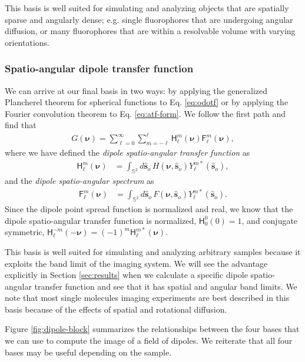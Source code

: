 \documentclass[]{osa-article}
\providecommand{\msf}[1]{\mathsf{#1}}
\providecommand{\so}{\mathbf{\hat{s}}_o}
\providecommand{\mbb}[1]{\mathbb{#1}}
\providecommand{\bs}[1]{\boldsymbol{#1}}
\providecommand{\bv}{\bs{\nu}}
\providecommand{\lmsum}{\sum_{\ell=0}^\infty\sum_{m=-\ell}^{\ell}}
\begin{document}
This basis is well suited for simulating and analyzing objects that are
spatially sparse and angularly dense; e.g. single fluorophores that are
undergoing angular diffusion, or many fluorophores that are within a resolvable
volume with varying orientations.

\subsubsection{Spatio-angular dipole transfer function}
We can arrive at our final basis in two ways: by applying the generalized
Plancherel theorem for spherical functions to Eq. \eqref{eq:odotf} or by applying
the Fourier convolution theorem to Eq. \eqref{eq:atf-form}. We follow the
first path and find that
\begin{align}
G(\bv) = \lmsum \msf{H}_\ell^m(\bv)\msf{F}_\ell^m(\bv) \label{eq:saft},
\end{align}
where we have defined the \textit{dipole spatio-angular transfer function} as
  \begin{align}
  \msf{H}_\ell^m(\bv) &= \int_{\mbb{S}^2}d\so\, H(\bv, \so)Y_\ell^{m*}(\so),
  \end{align}
  and the \textit{dipole spatio-angular spectrum} as
  \begin{align}
  \msf{F}_\ell^m(\bv) &= \int_{\mbb{S}^2}d\so\, F(\bv, \so)Y_\ell^{m*}(\so).
  \end{align}
  Since the dipole point spread function is normalized and real, we know
  that the dipole spatio-angular transfer function is normalized,
  $\msf{H}_0^0(0) = 1$, and conjugate symmetric,
  $\msf{H}_\ell^{-m}(-\bv) = (-1)^m\msf{H}_\ell^{m*}(\bv)$.
  
  This basis is well suited for simulating and analyzing arbitrary samples
  because it exploits the band limit of the imaging system. We will see the
  advantage explicitly in Section \ref{sec:results} when we calculate a specific
  dipole spatio-angular transfer function and see that it has spatial and
  angular band limits. We note that most single molecules imaging experiments
  are best described in this basis because of the effects of spatial and
  rotational diffusion.

  Figure \ref{fig:dipole-block} summarizes the relationships between the four
  bases that we can use to compute the image of a field of dipoles. We reiterate
  that all four bases may be useful depending on the sample.
    
\end{document}
